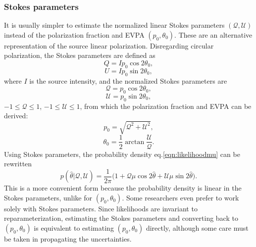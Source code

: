 \subsubsection{Stokes parameters}
It is usually simpler to estimate the normalized linear Stokes parameters $(\mathcal{Q}, \mathcal{U})$ instead of the polarization fraction and EVPA $(p_0, \theta_0)$. These are an alternative representation of the source linear polarization. Disregarding circular polarization, the Stokes parameters are defined as
\begin{equation}
    Q = Ip_0\cos2\theta_0,
    \label{eqn:q1}
\end{equation}
\begin{equation}
    U = Ip_0\sin2\theta_0,
    \label{eqn:u1}
\end{equation}
where $I$ is the source intensity, and the normalized Stokes parameters are
\begin{equation}
    \mathcal{Q} = p_0\cos2\theta_0,
    \label{eqn:qq1}
\end{equation}
\begin{equation}
    \mathcal{U} = p_0\sin2\theta_0,
    \label{eqn:uu1}
\end{equation}
$-1 \leq \mathcal{Q} \leq 1$, $-1 \leq \mathcal{U} \leq 1$, from which the polarization fraction and EVPA can be derived:
\begin{equation}
    p_0 = \sqrt{\mathcal{Q}^2 + \mathcal{U}^2},
    \label{eqn:p}
\end{equation}
\begin{equation}
    \theta_0 = \frac{1}{2}\arctan\frac{\mathcal{U}}{\mathcal{Q}}.
    \label{eqn:th}
\end{equation}
Using Stokes parameters, the probability density eq.\ref{eqn:likelihoodmu} can be rewritten
\begin{equation}
    p(\hat{\theta}|\mathcal{Q},\mathcal{U}) =  \frac{1}{2\pi} \big(1 + \mathcal{Q}\mu\cos2\hat{\theta} + \mathcal{U}\mu\sin2\hat{\theta} \big).
    \label{eqn:prob_stokes}
\end{equation}
This is a more convenient form because the probability density is linear in the Stokes parameters, unlike for $(p_0, \theta_0)$. Some researchers even prefer to work solely with Stokes parameters. Since likelihoods are invariant to reparameterization, estimating the Stokes parameters and converting back to $(p_0, \theta_0)$ is equivalent to estimating $(p_0, \theta_0)$ directly, although some care must be taken in propagating the uncertainties.

